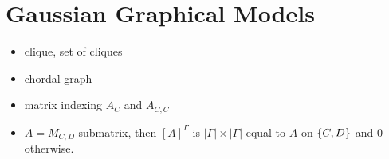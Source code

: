 \part{Gaussian Graphical Models}

\begin{itemize}
    \item clique, set of cliques
    \item chordal graph
    \item matrix indexing $A_C$ and $A_{C, C}$
    \item $A = M_{C, D}$ submatrix, then $[A]^\Gamma$ is $|\Gamma| \times |\Gamma|$ equal to $A$ on ${\left\{C, D\right\}}$ and 0 otherwise.
\end{itemize}



\newpage    
